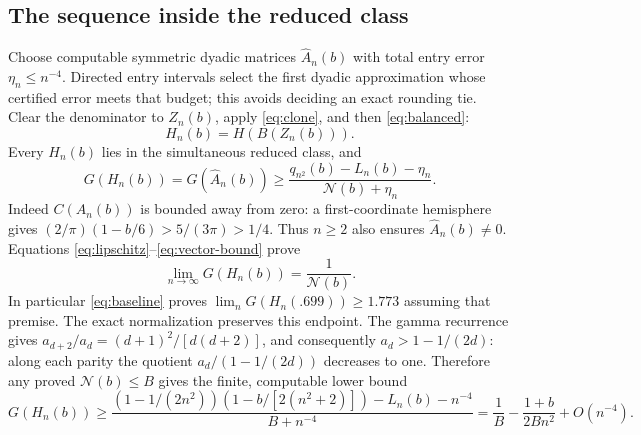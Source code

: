 \documentclass[11pt]{article}
\newcommand{\N}{\mathcal N}
\begin{document}
\subsection{The sequence inside the reduced class}
Choose computable symmetric dyadic matrices $\widehat A_n(b)$ with
total entry error $\eta_n\le n^{-4}$. Directed entry intervals select
the first dyadic approximation whose certified error meets that budget;
this avoids deciding an exact rounding tie. Clear the denominator to
$Z_n(b)$, apply \eqref{eq:clone}, and then \eqref{eq:balanced}:
\begin{equation}\label{eq:final-sequence}
 \boxed{\quad H_n(b)=H(B(Z_n(b))).\quad}
\end{equation}
Every $H_n(b)$ lies in the simultaneous reduced class, and
\[
 G(H_n(b))=G(\widehat A_n(b))
 \ge\frac{q_{n^2}(b)-L_n(b)-\eta_n}{\N(b)+\eta_n}.
\]
Indeed $C(A_n(b))$ is bounded away from zero: a first-coordinate
hemisphere gives $(2/\pi)(1-b/6)>5/(3\pi)>1/4$.
Thus $n\ge2$ also ensures $\widehat A_n(b)\ne0$. Equations
\eqref{eq:lipschitz}--\eqref{eq:vector-bound} prove
\begin{equation}\label{eq:limit}
 \lim_{n\to\infty}G(H_n(b))=\frac1{\N(b)}.
\end{equation}
In particular \eqref{eq:baseline} proves
$\lim_nG(H_n(.699))\ge1.773$ assuming that premise.
The exact normalization preserves this endpoint.
The gamma recurrence gives
$a_{d+2}/a_d=(d+1)^2/[d(d+2)]$, and consequently
$a_d>1-1/(2d)$: along each parity the quotient
$a_d/(1-1/(2d))$ decreases to one.
Therefore any proved $\N(b)\le B$ gives the finite, computable lower bound
\begin{equation}\label{eq:finite-ratio}
 G(H_n(b))\ge
 \frac{(1-1/(2n^2))(1-b/[2(n^2+2)])-L_n(b)-n^{-4}}
 {B+n^{-4}}
 =\frac1B-\frac{1+b}{2Bn^2}+O(n^{-4}).
\end{equation}
\end{document}
